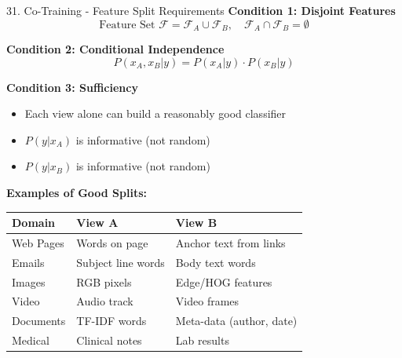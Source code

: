 \documentclass[8pt]{beamer}
\begin{document}
	\begin{frame}{31. Co-Training - Feature Split Requirements}
		\fontsize{6.5}{7.5}\selectfont
		\textbf{Condition 1: Disjoint Features}
		\[
		\text{Feature Set } \mathcal{F} = \mathcal{F}_A \cup \mathcal{F}_B, \quad \mathcal{F}_A \cap \mathcal{F}_B = \emptyset
		\]
		
		\textbf{Condition 2: Conditional Independence}
		\[
		P(x_A, x_B | y) = P(x_A | y) \cdot P(x_B | y)
		\]
		
		\textbf{Condition 3: Sufficiency}
		\begin{itemize}
			\item Each view alone can build a reasonably good classifier
			\item $P(y|x_A)$ is informative (not random)
			\item $P(y|x_B)$ is informative (not random)
		\end{itemize}
		
		\textbf{Examples of Good Splits:}
		
		\begin{tabular}{|p{3.0cm}|p{3.0cm}|p{3.0cm}|}
			\hline
			\textbf{Domain} & \textbf{View A} & \textbf{View B} \\
			\hline
			Web Pages & Words on page & Anchor text from links \\
			\hline
			Emails & Subject line words & Body text words \\
			\hline
			Images & RGB pixels & Edge/HOG features \\
			\hline
			Video & Audio track & Video frames \\
			\hline
			Documents & TF-IDF words & Meta-data (author, date) \\
			\hline
			Medical & Clinical notes & Lab results \\
			\hline
		\end{tabular}
	\end{frame}
	
\end{document}
